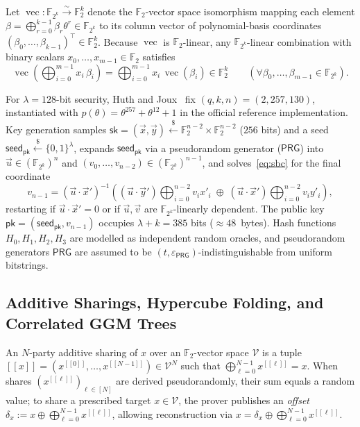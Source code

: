 \documentclass[11pt,a4paper]{article}
\theoremstyle{definition}
\theoremstyle{remark}
\newcommand{\Ftwo}{\mathbb{F}_2}
\newcommand{\Ftwok}{\mathbb{F}_{2^k}}
\newcommand{\pk}{\mathsf{pk}}
\newcommand{\sk}{\mathsf{sk}}
\newcommand{\PRG}{\mathsf{PRG}}
\newcommand{\vecF}{\operatorname{vec}}
\newcommand{\share}[1]{[\![#1]\!]}
\begin{document}
Let $\vecF : \Ftwok \xrightarrow{\sim} \Ftwo^k$ denote the $\Ftwo$-vector space isomorphism mapping each element $\beta = \bigoplus_{r=0}^{k-1} \beta_r \theta^r \in \Ftwok$ to its column vector of polynomial-basis coordinates $(\beta_0, \dots, \beta_{k-1})^\top \in \Ftwo^k$. Because $\vecF$ is $\Ftwo$-linear, any $\Ftwok$-linear combination with binary scalars $x_0, \dots, x_{m-1} \in \Ftwo$ satisfies
\begin{equation}
\label{eq:vec-linearity}
\vecF\!\left(\bigoplus_{i=0}^{m-1} x_i \, \beta_i\right) = \bigoplus_{i=0}^{m-1} x_i \, \vecF(\beta_i) \in \Ftwo^k \qquad (\forall \beta_0, \dots, \beta_{m-1} \in \Ftwok).
\end{equation}

For $\lambda = 128$-bit security, Huth and Joux~\cite{HJ24,HJ25} fix $(q, k, n) = (2, 257, 130)$, instantiated with $p(\theta) = \theta^{257} + \theta^{12} + 1$ in the official reference implementation. Key generation samples $\sk = (\vec{x}, \vec{y}) \xleftarrow{\$} \Ftwo^{n-2} \times \Ftwo^{n-2}$ ($256$ bits) and a seed $\mathsf{seed}_{\pk} \xleftarrow{\$} \{0,1\}^\lambda$, expands $\mathsf{seed}_{\pk}$ via a pseudorandom generator ($\PRG$) into $\vec{u} \in (\Ftwok)^n$ and $(v_0, \dots, v_{n-2}) \in (\Ftwok)^{n-1}$, and solves~\eqref{eq:sbc} for the final coordinate
\begin{equation}
\label{eq:keygen-vn}
v_{n-1} = (\vec{u} \cdot \vec{x}')^{-1} \left((\vec{u} \cdot \vec{y}') \bigoplus_{i=0}^{n-2} v_i x'_i \;\oplus\; (\vec{u} \cdot \vec{x}') \bigoplus_{i=0}^{n-2} v_i y'_i\right),
\end{equation}
restarting if $\vec{u} \cdot \vec{x}' = 0$ or if $\vec{u}, \vec{v}$ are $\Ftwok$-linearly dependent. The public key $\pk = (\mathsf{seed}_{\pk}, v_{n-1})$ occupies $\lambda + k = 385$ bits ($\approx 48$~bytes). Hash functions $H_0, H_1, H_2, H_3$ are modelled as independent random oracles, and pseudorandom generators $\PRG$ are assumed to be $(t, \varepsilon_{\PRG})$-indistinguishable from uniform bitstrings.

\subsection{Additive Sharings, Hypercube Folding, and Correlated GGM Trees}
\label{subsec:prelim-trees}
An $N$-party additive sharing of $x$ over an $\Ftwo$-vector space $\mathcal{V}$ is a tuple $\share{x} = (x^{\share{0}}, \dots, x^{\share{N-1}}) \in \mathcal{V}^N$ such that $\bigoplus_{\ell=0}^{N-1} x^{\share{\ell}} = x$. When shares $(x^{\share{\ell}})_{\ell \in [N]}$ are derived pseudorandomly, their sum equals a random value; to share a prescribed target $x \in \mathcal{V}$, the prover publishes an \emph{offset} $\delta_x := x \oplus \bigoplus_{\ell=0}^{N-1} x^{\share{\ell}}$, allowing reconstruction via $x = \delta_x \oplus \bigoplus_{\ell=0}^{N-1} x^{\share{\ell}}$.
\end{document}

